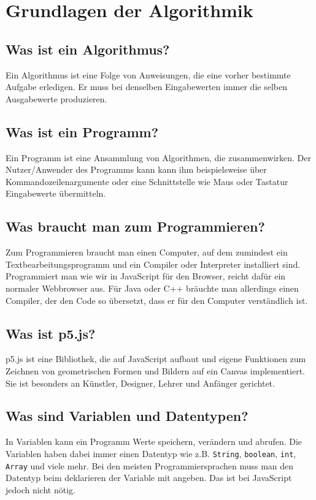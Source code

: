 \documentclass[12pt]{report}
\begin{document}
    \chapter{Grundlagen der Algorithmik}

    \section{Was ist ein Algorithmus?}
    Ein Algorithmus ist eine Folge von Anweisungen, die eine vorher bestimmte
    Aufgabe erledigen. Er muss bei denselben Eingabewerten immer die selben 
    Ausgabewerte produzieren.

    \section{Was ist ein Programm?}
    Ein Programm ist eine Ansammlung von Algorithmen, die zusammenwirken.
    Der Nutzer/Anwender des Programms kann kann ihm beispielsweise über
    Kommandozeilenargumente oder eine Schnittstelle wie Maus oder Tastatur
    Eingabewerte übermitteln.

    \section{Was braucht man zum Programmieren?}
    Zum Programmieren braucht man einen Computer, auf dem zumindest ein
    Textbearbeitungsprogramm und ein Compiler oder Interpreter installiert
    sind. Programmiert man wie wir in JavaScript für den Browser, reicht
    dafür ein normaler Webbrowser aus. Für Java oder C++ bräuchte man allerdings
    einen Compiler, der den Code so übersetzt, dass er für den Computer
    verständlich ist.

    \section{Was ist p5.js?}
    p5.js ist eine Bibliothek, die auf JavaScript aufbaut und eigene Funktionen
    zum Zeichnen von geometrischen Formen und Bildern auf ein Canvas implementiert.
    Sie ist besonders an Künstler, Designer, Lehrer und Anfänger gerichtet.

    \section{Was sind Variablen und Datentypen?}
    In Variablen kann ein Programm Werte speichern, verändern und abrufen.
    Die Variablen haben dabei immer einen Datentyp wie z.B. \texttt{String},
    \texttt{boolean}, \texttt{int}, \texttt{Array} und viele mehr. Bei den
    meisten Programmiersprachen muss man den Datentyp beim deklarieren der
    Variable mit angeben. Das ist bei JavaScript jedoch nicht nötig.
\end{document}
